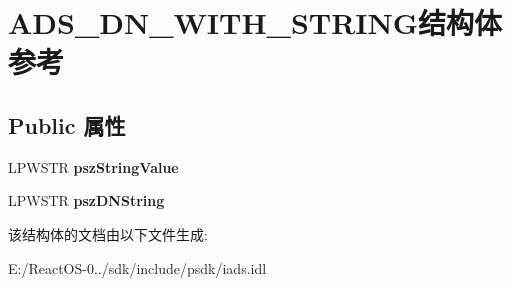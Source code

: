 \hypertarget{struct_a_d_s___d_n___w_i_t_h___s_t_r_i_n_g}{}\section{A\+D\+S\+\_\+\+D\+N\+\_\+\+W\+I\+T\+H\+\_\+\+S\+T\+R\+I\+N\+G结构体 参考}
\label{struct_a_d_s___d_n___w_i_t_h___s_t_r_i_n_g}
\subsection*{Public 属性}
\begin{DoxyCompactItemize}
\item 
\mbox{\label{struct_a_d_s___d_n___w_i_t_h___s_t_r_i_n_g_acb944d1dea34623c6e5d6b419c1d5e16}} 
L\+P\+W\+S\+TR {\bfseries psz\+String\+Value}
\item 
\mbox{\label{struct_a_d_s___d_n___w_i_t_h___s_t_r_i_n_g_ac46286fa3242a0757bf97b14b2a7e521}} 
L\+P\+W\+S\+TR {\bfseries psz\+D\+N\+String}
\end{DoxyCompactItemize}


该结构体的文档由以下文件生成\+:\begin{DoxyCompactItemize}
\item 
E\+:/\+React\+O\+S-\/0../sdk/include/psdk/iads.\+idl\end{DoxyCompactItemize}
